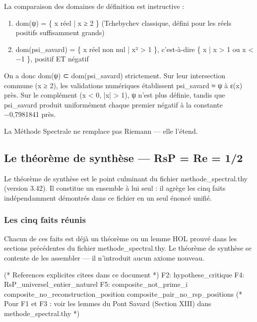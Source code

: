 \documentclass[11pt,a4paper]{article}
\begin{document}
La comparaison des domaines de définition est instructive :

\begin{enumerate}[leftmargin=*]
\item dom(ψ) = \{ x réel | x ≥ 2 \} (Tchebychev classique, défini pour les réels positifs suffisamment grands)
\item dom(psi\_savard) = \{ x réel non nul | x² > 1 \}, c'est-à-dire \{ x | x > 1 ou x < −1 \}, positif ET négatif
\end{enumerate}
On a donc dom(ψ) ⊂ dom(psi\_savard) strictement. Sur leur intersection commune (x ≥ 2), les validations numériques établissent psi\_savard ≈ ψ à ε(x) près. Sur le complément (x < 0, |x| > 1), ψ n'est plus définie, tandis que psi\_savard produit uniformément chaque premier négatif à la constante −0,7981841 près.

La Méthode Spectrale ne remplace pas Riemann — elle l'étend.

\subsection{Le théorème de synthèse — RsP = Re = 1/2}

Le théorème de synthèse est le point culminant du fichier methode\_spectral.thy (version 3.42). Il constitue un ensemble à lui seul : il agrège les cinq faits indépendamment démontrés dans ce fichier en un seul énoncé unifié.

\subsubsection{Les cinq faits réunis}
Chacun de ces faits est déjà un théorème ou un lemme HOL prouvé dans les sections précédentes du fichier methode\_spectral.thy. Le théorème de synthèse se contente de les assembler — il n'introduit aucun axiome nouveau.

\begin{holcode}[title={Index HOL — Faits mobilisés par la synthèse}]
(* References explicites citees dans ce document *)
F2: hypothese_critique
F4: RsP_universel_entier_naturel
F5: composite_not_prime_i composite_no_reconstruction_position composite_pair_no_rsp_positions
(* Pour F1 et F3 : voir les lemmes du Pont Savard (Section XIII) dans methode_spectral.thy *)
\end{holcode}
\end{document}
